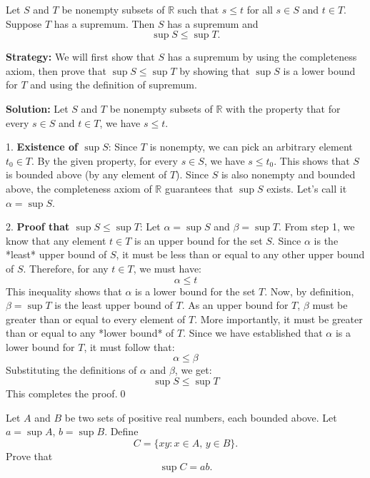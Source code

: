 \begin{problembox}
\begin{problemstatement}
Let \( S \) and \( T \) be nonempty subsets of \( \mathbb{R} \) such that \( s \leq t \) for all \( s \in S \) and \( t \in T \). Suppose \( T \) has a supremum. Then \( S \) has a supremum and
\[
\sup S \leq \sup T.
\]
\end{problemstatement}
\end{problembox}

\noindent\textbf{Strategy:} We will first show that $S$ has a supremum by using the completeness axiom, then prove that $\sup S \leq \sup T$ by showing that $\sup S$ is a lower bound for $T$ and using the definition of supremum.

\bigskip\noindent\textbf{Solution:}
Let $S$ and $T$ be nonempty subsets of $\mathbb{R}$ with the property that for every $s \in S$ and $t \in T$, we have $s \leq t$.

1.  \textbf{Existence of $\sup S$}:
Since $T$ is nonempty, we can pick an arbitrary element $t_0 \in T$. By the given property, for every $s \in S$, we have $s \leq t_0$. This shows that $S$ is bounded above (by any element of $T$). Since $S$ is also nonempty and bounded above, the completeness axiom of $\mathbb{R}$ guarantees that $\sup S$ exists. Let's call it $\alpha = \sup S$.

2.  \textbf{Proof that $\sup S \leq \sup T$}:
Let $\alpha = \sup S$ and $\beta = \sup T$.
From step 1, we know that any element $t \in T$ is an upper bound for the set $S$.
Since $\alpha$ is the *least* upper bound of $S$, it must be less than or equal to any other upper bound of $S$. Therefore, for any $t \in T$, we must have:
\[
\alpha \leq t
\]
This inequality shows that $\alpha$ is a lower bound for the set $T$.
Now, by definition, $\beta = \sup T$ is the least upper bound of $T$. As an upper bound for $T$, $\beta$ must be greater than or equal to every element of $T$. More importantly, it must be greater than or equal to any *lower bound* of $T$.
Since we have established that $\alpha$ is a lower bound for $T$, it must follow that:
\[
\alpha \leq \beta
\]
Substituting the definitions of $\alpha$ and $\beta$, we get:
\[
\sup S \leq \sup T
\]
This completes the proof.\qed


\begin{problembox}
\begin{problemstatement}
Let \( A \) and \( B \) be two sets of positive real numbers, each bounded above. Let \( a = \sup A \), \( b = \sup B \). Define
\[
C = \{ xy : x \in A,\, y \in B \}.
\]
Prove that
\[
\sup C = ab.
\]
\end{problemstatement}
\end{problembox}

